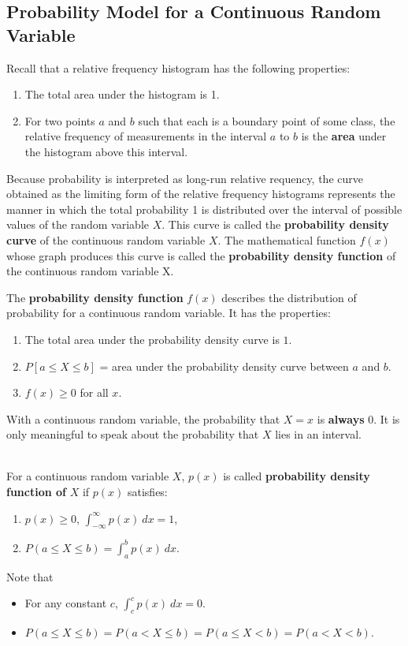 \documentclass[12pt,a4paper]{article}
\newcommand{\dispsty}{\displaystyle}
\begin{document}
\subsection{Probability Model for a Continuous Random Variable}
Recall that a relative frequency histogram has the following properties: \begin{enumerate}
	\item The total area under the histogram is 1.
	\item  For two points $a$ and $b$ such that each is a boundary point of some class, the relative frequency of measurements in the interval $a$ to $b$ is the \textbf{area} under the histogram above this interval.
\end{enumerate}
Because probability is interpreted as long-run relative requency, the curve obtained as the limiting form of the relative frequency histograms represents the manner in which the total probability 1 is distributed over the interval of possible values of the random variable $X$. This curve is called the \textbf{probability density curve} of the continuous random variable $X$. The mathematical function $f(x)$ whose graph produces this curve is called the \textbf{probability density function} of the continuous random variable X.
\\ 
\begin{tcolorbox}[colback=white]
	The \textbf{probability density function} $f(x)$ describes the distribution of probability for a continuous random variable. It has the properties: \begin{enumerate}
		\item The total area under the probability density curve is $1$.
		\item $P[a\leq X\leq b]$ = area under the probability density curve between $a$ and $b$.
		\item $f(x)\geq 0$ for all $x$.
	\end{enumerate}
\end{tcolorbox}
\begin{tcolorbox}[colback=white]
With a continuous random variable, the probability that $X=x$ is \textbf{always} 0. It is only meaningful to speak about the probability that $X$ lies in an interval.
\end{tcolorbox}\ \\
For a continuous random variable $X$, $p(x)$ is called \textbf{probability density function of} $X$ if $p(x)$ satisfies: \begin{enumerate}
	\item $p(x)\geq 0$, $\dispsty\int_{-\infty}^{\infty}p(x)\ dx=1$,
	\item $P(a\leq X\leq b)=\dispsty\int_{a}^bp(x)\ dx$.
\end{enumerate}
Note that
\begin{itemize}
\item For any constant $c$, $\dispsty\int_{c}^cp(x)\ dx=0$.
\item $P(a\leq X\leq b)=P(a< X\leq b)=P(a\leq X< b)=P(a< X< b)$.
\end{itemize}
\end{document}
